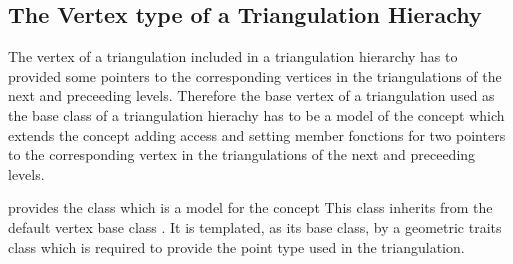 \subsection{The Vertex type of a Triangulation Hierachy}
The vertex of a triangulation  
included in a  triangulation hierarchy has to provided
some pointers to the corresponding vertices in the
triangulations of the next and preceeding levels.
Therefore the base vertex of a triangulation used as
the base class of a triangulation hierachy has to be a model of the
concept
 which extends
the concept  adding
access and setting member fonctions 
for two pointers  to the corresponding vertex in the 
triangulations of the next and preceeding levels.

\cgal provides the class 
which is a model for the concept 
This class inherits from the default vertex base class
. It is templated,
as its base class, by a geometric traits class 
which is required to provide  the point type
used in the triangulation.